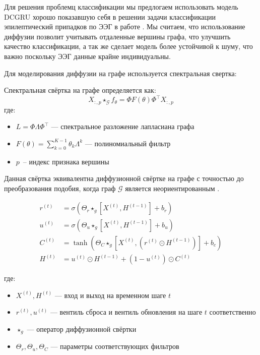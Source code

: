 \documentclass[12pt, twoside]{article}
\begin{document}
Для решения проблемц классификации мы предлогаем использовать модель DCGRU \cite{DCRNN} хорошо показавшую себя в решении задачи классификации эпилептический припадков по ЭЭГ в работе \cite{DCGRU} . Мы считаем, что использование диффузии позволит учитывать отдаленные вершины графа, что улучшить качество классификации, а так же сделает модель более устойчивой к шуму, что важно поскольку ЭЭГ данные крайне индивидуальны.

Для моделирования диффузии на графе используется спектральная свертка:

Спектральная свёртка на графе определяется как:
\[
X_{:,p} \star_{\mathcal{G}} f_\theta = \Phi F(\theta) \Phi^\top X_{:,p}
\]
где:
\begin{itemize}
    \item $L = \Phi \Lambda \Phi^\top$ --- спектральное разложение лапласиана графа
    \item $F(\theta) = \sum_{k=0}^{K-1} \theta_k \Lambda^k$ --- полиномиальный фильтр
    \item $p$~-- индекс признака вершины
\end{itemize}
Данная свёртка эквивалентна диффузионной свёртке на графе с точностью до преобразования подобия, когда граф $\mathcal{G}$ является неориентированным \cite{DCRNN}.

\begin{align*}
r^{(t)} &= \sigma\left(\Theta_r \star_{g} \left[X^{(t)}, H^{(t-1)}\right] + b_r\right) \\
u^{(t)} &= \sigma\left(\Theta_u \star_{g} \left[X^{(t)}, H^{(t-1)}\right] + b_u\right) \\
C^{(t)} &= \tanh\left(\Theta_C \star_{g} \left[X^{(t)}, \left(r^{(t)} \odot H^{(t-1)}\right)\right] + b_c\right) \\
H^{(t)} &= u^{(t)} \odot H^{(t-1)} + \left(1 - u^{(t)}\right) \odot C^{(t)}
\end{align*}

где:
\begin{itemize}
    \item $X^{(t)}, H^{(t)}$ --- вход и выход на временном шаге $t$
    \item $r^{(t)}, u^{(t)}$ --- вентиль сброса и вентиль обновления на шаге $t$ соответственно
    \item $\star_{g}$ --- оператор диффузионной свёртки
    \item $\Theta_r, \Theta_u, \Theta_C$ --- параметры соответствующих фильтров
\end{itemize}
\end{document}
